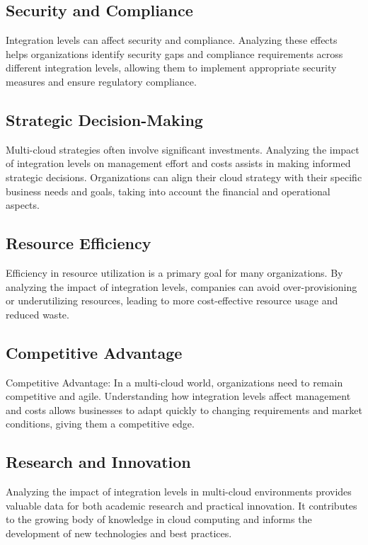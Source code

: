 \subsection*{Security and Compliance}
Integration levels can affect security and compliance. 
Analyzing these effects helps organizations identify security gaps and compliance requirements across different integration levels, 
allowing them to implement appropriate security measures and ensure regulatory compliance.

\subsection*{Strategic Decision-Making}
Multi-cloud strategies often involve significant investments. Analyzing the impact of integration levels on management effort and 
costs assists in making informed strategic decisions. 
Organizations can align their cloud strategy with their specific business needs and goals, taking into account the financial and operational aspects.

\subsection*{Resource Efficiency}
Efficiency in resource utilization is a primary goal for many organizations. 
By analyzing the impact of integration levels, companies can avoid over-provisioning or underutilizing resources, 
leading to more cost-effective resource usage and reduced waste.

\subsection*{Competitive Advantage}
Competitive Advantage: In a multi-cloud world, organizations need to remain competitive and agile. 
Understanding how integration levels affect management and costs allows businesses to adapt quickly to changing requirements and market conditions, 
giving them a competitive edge.

\subsection*{Research and Innovation} Analyzing the impact of integration levels in multi-cloud environments provides valuable data for both academic research and practical innovation. It contributes to the growing body of knowledge in cloud computing and informs the development of new technologies and best practices.

